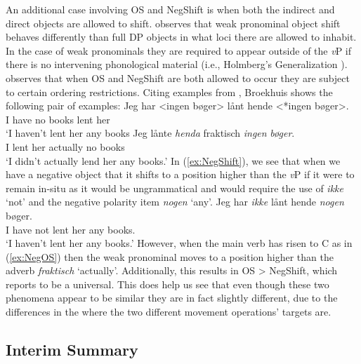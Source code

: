 \documentclass[12pt, letterpaper]{article}
\begin{document}
An additional case involving OS and NegShift is when both the indirect and direct objects are allowed to shift. \citet[417f]{broekhuisUnificationObjectShift2020} observes that weak pronominal object shift behaves differently than full DP objects in what loci there are allowed to inhabit. In the case of weak pronominals they are required to appear outside of the \textit{v}P if there is no intervening phonological material (i.e., Holmberg's Generalization \cite{holmbergWordOrderSyntactic1986,holmbergRemarksHolmbergGeneralization1999}). \citeauthor{broekhuisUnificationObjectShift2020} observes that when OS and NegShift are both allowed to occur they are subject to certain ordering restrictions. Citing examples from \citet[163ff]{christensenInterfacesNegationSyntax2005}, Broekhuis shows the following pair of examples:
	\ea 
		\ea \label{ex:NegShift}
		\gll Jeg har <ingen bøger> lånt hende <*ingen bøger>.\\
		I have no books lent her\\
		\glt `I haven't lent her any books
		\ex \label{ex:NegOS}
		\gll Jeg lånte \textit{henda} fraktisch \textit{ingen} \textit{bøger}.\\
		I lent her actually no books\\
		\glt `I didn't actually lend her any books.'
		\z 
	\z
In (\ref{ex:NegShift}), we see that when we have a negative object that it shifts to a position higher than the \textit{v}P if it were to remain in-situ as it would be ungrammatical and would require the use of \textit{ikke} `not' and the negative polarity item \textit{nogen} `any'.
	\ea
	\gll Jeg har \textit{ikke} lånt hende \textit{nogen} bøger.\\
	I have not lent her any books.\\
	\glt `I haven't lent her any books.'
	\z
However, when the main verb has risen to C as in (\ref{ex:NegOS}) then the weak pronominal moves to a position higher than the adverb \textit{fraktisch} `actually'. Additionally, this results in OS > NegShift, which \citeauthor{broekhuisUnificationObjectShift2020} reports to be a universal. This does help us see that even though these two phenomena appear to be similar they are in fact slightly different, due to the differences in the where the two different movement operations' targets are.

\subsection{Interim Summary} \label{sec:SUMMARY}
\end{document}
